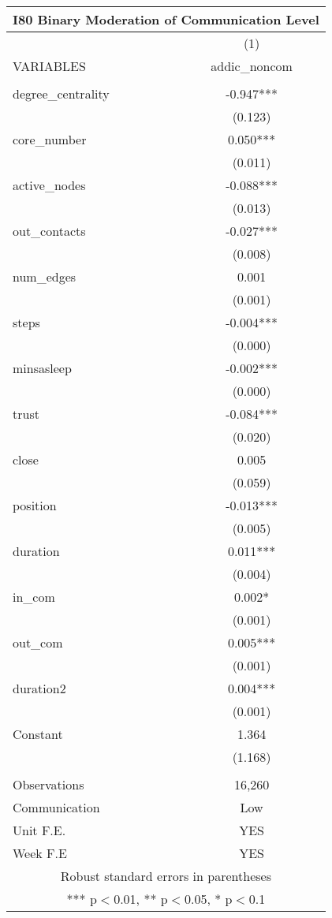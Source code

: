 \documentclass[]{article}
\begin{document}
\begin{tabular}{lc}
\multicolumn{2}{c}{I80 Binary Moderation of Communication Level} \\ \hline
 & (1) \\
VARIABLES & addic\_noncom \\ \hline
 &  \\
degree\_centrality & -0.947*** \\
 & (0.123) \\
core\_number & 0.050*** \\
 & (0.011) \\
active\_nodes & -0.088*** \\
 & (0.013) \\
out\_contacts & -0.027*** \\
 & (0.008) \\
num\_edges & 0.001 \\
 & (0.001) \\
steps & -0.004*** \\
 & (0.000) \\
minsasleep & -0.002*** \\
 & (0.000) \\
trust & -0.084*** \\
 & (0.020) \\
close & 0.005 \\
 & (0.059) \\
position & -0.013*** \\
 & (0.005) \\
duration & 0.011*** \\
 & (0.004) \\
in\_com & 0.002* \\
 & (0.001) \\
out\_com & 0.005*** \\
 & (0.001) \\
duration2 & 0.004*** \\
 & (0.001) \\
Constant & 1.364 \\
 & (1.168) \\
 &  \\
Observations & 16,260 \\
Communication & Low \\
Unit F.E. & YES \\
 Week F.E & YES \\ \hline
\multicolumn{2}{c}{ Robust standard errors in parentheses} \\
\multicolumn{2}{c}{ *** p$<$0.01, ** p$<$0.05, * p$<$0.1} \\
\end{tabular}
\end{document}

